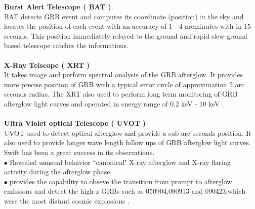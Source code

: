 \textbf{Burst Alert Telescope ( BAT )}.\\
BAT detects GRB event and computes its coordinate (position) in the sky and
locates the position of each event with an accuracy of 1 - 4 arcminutes with in 15
seconds. This position immediately relayed to the ground and rapid slew-ground
based telescope catches the informations.\\\\
\textbf{X-Ray Telscope ( XRT )}\\
It takes image and perform spectral analysis of the GRB afterglow. It  provides
more precise position of GRB with a typical error circle of approximation 2 arc seconds radius. The XRT also used to perform long term monitoring of GRB afterglow light curves and operated in energy range of 0.2 keV - 10 keV .\\\\
\textbf{ Ultra Violet optical Telescope ( UVOT )}\\
UVOT used to detect optical afterglow and provide a sub-arc seconds position. It
also used to provide longer wave length follow ups of GRB afterglow light curves.
 Swift has been a great success in its observations.\\
$\bullet$ Revealed unusual behavior  “canonical" X-ray afterglow  and  X-ray flaring activity during the afterglow phase.\\
$\bullet$ provides the capability to obseve the transition from prompt to afterglow emissions and  detect  the high-z GRBs such as 050904,080913 and 090423,which were the most distant cosmic explosions \citep {5} \citep{7}.\\\\

